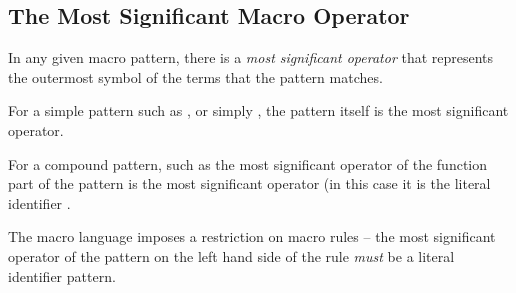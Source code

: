 \subsection{The Most Significant Macro Operator}
\label{mostSignificant}
In any given macro pattern, there is a \emph{most significant operator} that represents the outermost symbol of the terms that the pattern matches.

For a simple pattern such as , or simply , the pattern itself is the most significant operator.

For a compound pattern, such as  the most significant operator of the function part of the pattern is the most significant operator (in this case it is the literal identifier .

The macro language imposes a restriction on macro rules -- the most significant operator of the pattern on the left hand side of the rule \emph{must} be a literal identifier pattern.

